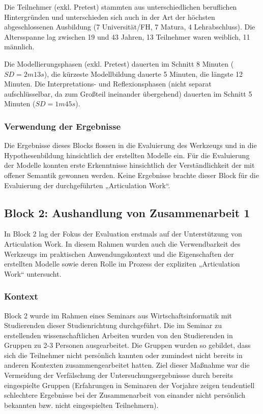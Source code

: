 Die Teilnehmer (exkl. Pretest) stammten aus unterschiedlichen beruflichen Hintergründen und unterschieden sich auch in der Art der höchsten abgeschlossenen Ausbildung (7 Universität/FH, 7 Matura, 4 Lehrabschluss). Die Altersspanne lag zwischen 19 und 43 Jahren, 13 Teilnehmer waren weiblich, 11 männlich.

Die Modellierungsphasen (exkl. Pretest) dauerten im Schnitt 8 Minuten ($SD=2m13s$), die kürzeste Modellbildung dauerte 5 Minuten, die längste 12 Minuten. Die Interpretations- und Reflexionsphasen (nicht separat aufschlüsselbar, da zum Großteil ineinander übergehend) dauerten im Schnitt 5 Minuten ($SD=1m45s$). 


\subsubsection{Verwendung der Ergebnisse} %
\label{ssub:1_verwendung_der_ergebnisse}

Die Ergebnisse dieses Blocks flossen in die Evaluierung des Werkzeugs und in die Hypothesenbildung hinsichtlich der erstellten Modelle ein. Für die Evaluierung der Modelle konnten erste Erkenntnisse hinsichtlich der Verständlichkeit der mit offener Semantik gewonnen werden. Keine Ergebnisse brachte dieser Block für die Evaluierung der durchgeführten „Articulation Work“.


\subsection{Block 2: Aushandlung von Zusammenarbeit 1}
\label{sub:eval_2}

In Block 2 lag der Fokus der Evaluation erstmals auf der Unterstützung von Articulation Work. In diesem Rahmen wurden auch die Verwendbarkeit des Werkzeugs im praktischen Anwendungskontext und die Eigenschaften der erstellten Modelle sowie deren Rolle im Prozess der expliziten „Articulation Work“ untersucht.

\subsubsection{Kontext} %
\label{ssub:2_kontext}

Block 2 wurde im Rahmen eines Seminars aus Wirtschaftsinformatik mit Studierenden dieser Studienrichtung durchgeführt. Die im Seminar zu erstellenden wissenschaftlichen Arbeiten wurden von den Studierenden in Gruppen zu 2-3 Personen ausgearbeitet. Die Gruppen wurden so gebildet, dass sich die Teilnehmer nicht persönlich kannten oder zumindest nicht bereits in anderen Kontexten zusammengearbeitet hatten. Ziel dieser Maßnahme war die Vermeidung der Verfälschung der Untersuchungsergebnissse durch bereits eingespielte Gruppen (Erfahrungen in Seminaren der Vorjahre zeigen tendentiell schlechtere Ergebnisse bei der Zusammenarbeit von einander nicht persönlich bekannten bzw. nicht eingespielten Teilnehmern).

